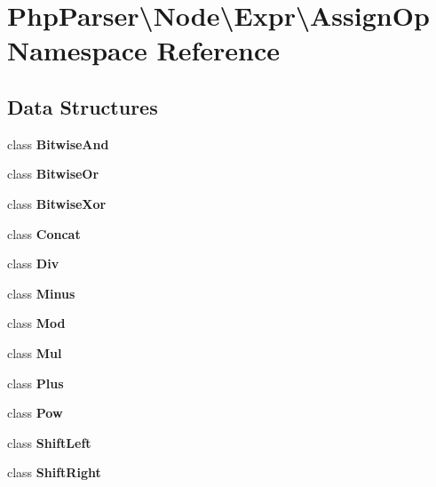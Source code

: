 \section{Php\+Parser\textbackslash{}Node\textbackslash{}Expr\textbackslash{}Assign\+Op Namespace Reference}
\label{namespace_php_parser_1_1_node_1_1_expr_1_1_assign_op}
\subsection*{Data Structures}
\begin{DoxyCompactItemize}
\item 
class {\bf Bitwise\+And}
\item 
class {\bf Bitwise\+Or}
\item 
class {\bf Bitwise\+Xor}
\item 
class {\bf Concat}
\item 
class {\bf Div}
\item 
class {\bf Minus}
\item 
class {\bf Mod}
\item 
class {\bf Mul}
\item 
class {\bf Plus}
\item 
class {\bf Pow}
\item 
class {\bf Shift\+Left}
\item 
class {\bf Shift\+Right}
\end{DoxyCompactItemize}
